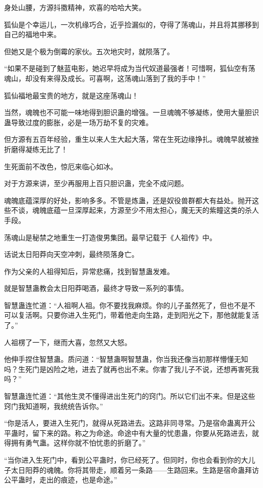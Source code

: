 \begin{this_body}
身处山腰，方源抖擞精神，欢喜的哈哈大笑。

狐仙是个幸运儿，一次机缘巧合，近乎捡漏似的，夺得了荡魂山，并且将其挪移到自己的福地中来。

但她又是个极为倒霉的家伙。五次地灾时，就陨落了。

“如果不是碰到了魅蓝电影，她迟早将成为当代奴道最强者！可惜啊，狐仙空有荡魂山，却没有来得及成长。可喜啊，这荡魂山落到了我的手中！”

狐仙福地最宝贵的地方，就是这座荡魂山！

当然，魂魄也不可能一味地得到胆识蛊的增强。一旦魂魄不够凝练，使用大量胆识蛊导致过度的膨胀，必是一场万劫不复的灾难。

但方源有五百年经验，重生以来人生大起大落，常在生死边缘挣扎。魂魄早就被挫折磨得凝练无比了！

生死面前不改色，惊厄来临心如冰。

对于方源来讲，至少再服用上百只胆识蛊，完全不成问题。

魂魄底蕴深厚的好处，影响多多。不管是炼蛊，还是奴役兽群都大有益处。抛开这些不谈，魂魄底蕴一旦深厚起来，方源至少不用太担心，魔无天的紫瞳这类的杀人手段。

荡魂山是秘禁之地重生一打造俊男集团。最早记载于《人祖传》中。

话说太日阳莽向天空冲刺，最终陨落身亡。

作为父亲的人祖得知后，异常悲痛，找到智慧蛊发难。

就是智慧蛊教会太日阳莽喝酒，最终才导致一系列的事情。

智慧蛊连忙道：“人祖啊人祖。你不要找我麻烦。你的儿子虽然死了，但也不是不可以复活啊。只要你进入生死门，带着他走向生路，走到阳光之下，那他就能复活了。”

人祖楞了一下，继而大喜，忽然又大怒。

他伸手捏住智慧蛊。质问道：“智慧蛊啊智慧蛊，你当我还像当初那样懵懂无知吗？生死门是凶险之地，进去了就再也出不来。你害了我儿子不说，还想再害死我吗？”

智慧蛊连忙道：“其他生灵不懂得进出生死门的窍门。所以它们出不来。但是这些窍门我知道啊，我统统告诉你。”

“你是活人，要进入生死门，就得从死路进去。这路非同寻常。乃是宿命蛊离开公平蛊时，留下来的路。称之为命途。命途中有大量的忧患蛊，你要从死路进去，就得拥有勇气蛊。这样你就不怕忧患的折磨了。”

“当你进入生死门中，看到公平蛊时，你已经死了。但同时，你也会看到你的大儿子太日阳莽的魂魄。你将其带走，顺着另一条路——生路回来。生路是宿命蛊拜访公平蛊时，走出的痕迹，也是命途。”


\end{this_body}
